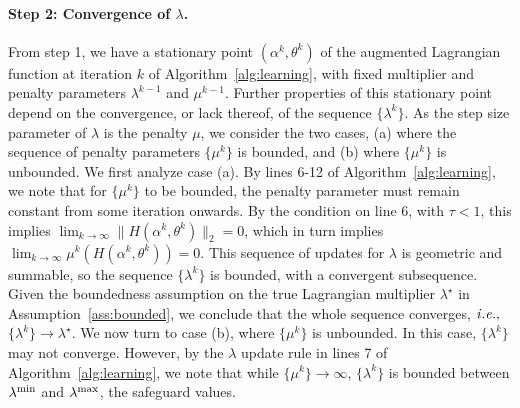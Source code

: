 \paragraph{Step 2: Convergence of $\lambda$.}
From step 1, we have a stationary point $(\alpha^k,\theta^k)$ of the augmented Lagrangian function at iteration $k$ of Algorithm~\ref{alg:learning}, with fixed multiplier and penalty parameters $\lambda^{k-1}$ and $\mu^{k-1}$. Further properties of this stationary point depend on the convergence, or lack thereof, of the sequence $\{\lambda^k\}$. 
As the step size parameter of $\lambda$ is the penalty $\mu$, we consider the two cases, (a) where the sequence of penalty parameters $\{\mu^k\}$ is bounded, and (b) where $\{\mu^k\}$ is unbounded. We first analyze case (a). By lines 6-12 of Algorithm~\ref{alg:learning}, we note that for $\{\mu^k\}$ to be bounded, the penalty parameter must remain constant from some iteration onwards. By the condition on line 6, with $\tau < 1$, this implies $\lim_{k \rightarrow \infty}\|H(\alpha^k,\theta^{k})\|_2 = 0$, which in turn implies $\lim_{k \rightarrow \infty} \mu^k(H(\alpha^k,\theta^{k})) = 0$. This sequence of updates for $\lambda$ is geometric and summable, so the sequence $\{\lambda^k\}$ is bounded, with a convergent subsequence. Given the boundedness assumption on the true Lagrangian multiplier $\lambda^\star$ in Assumption~\ref{ass:bounded}, we conclude 
that the whole sequence converges, ${\it i.e.},$ $\{\lambda^k\} \rightarrow \lambda^\star$. 
We now turn to case (b), where $\{\mu^k\}$ is unbounded. In this case, $\{\lambda^k\}$ may not converge. However, by the $\lambda$ update rule in lines 7 of Algorithm~\ref{alg:learning}, we note that while $\{\mu^k\} \rightarrow \infty$, $\{\lambda^k\}$ is bounded between $\lambda^{\rm{min}}$ and $\lambda^{\rm{max}}$, the safeguard values. 

